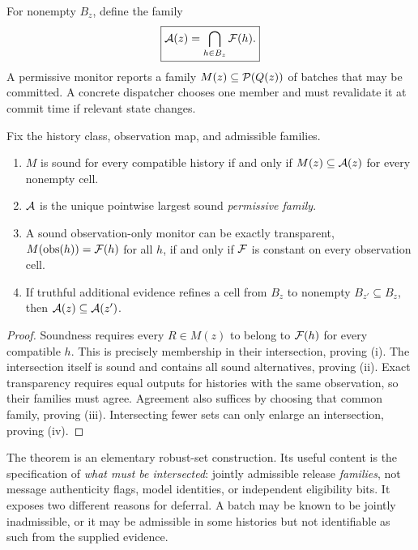 \begin{definition}
For nonempty $B_z$, define the family
\begin{equation}
\boxed{\mathcal A(z)=\bigcap_{h\in B_z}\mathcal F(h).}
\label{eq:envelope}
\end{equation}
A permissive monitor reports a family $M(z)\subseteq\mathcal P(Q(z))$ of batches that may be committed. A concrete dispatcher chooses one member and must revalidate it at commit time if relevant state changes.
\end{definition}

\begin{theorem}
Fix the history class, observation map, and admissible families.
\begin{enumerate}[label=(\roman*)]
\item $M$ is sound for every compatible history if and only if $M(z)\subseteq\mathcal A(z)$ for every nonempty cell.
\item $\mathcal A$ is the unique pointwise largest sound \emph{permissive family}.
\item A sound observation-only monitor can be exactly transparent, $M(\operatorname{obs}(h))=\mathcal F(h)$ for all $h$, if and only if $\mathcal F$ is constant on every observation cell.
\item If truthful additional evidence refines a cell from $B_z$ to nonempty $B_{z'}\subseteq B_z$, then $\mathcal A(z)\subseteq\mathcal A(z')$.
\end{enumerate}
\end{theorem}
\begin{proof}
Soundness requires every $R\in M(z)$ to belong to $\mathcal F(h)$ for every compatible $h$. This is precisely membership in their intersection, proving (i). The intersection itself is sound and contains all sound alternatives, proving (ii). Exact transparency requires equal outputs for histories with the same observation, so their families must agree. Agreement also suffices by choosing that common family, proving (iii). Intersecting fewer sets can only enlarge an intersection, proving (iv).
\end{proof}

The theorem is an elementary robust-set construction. Its useful content is the specification of \emph{what must be intersected}: jointly admissible release \emph{families}, not message authenticity flags, model identities, or independent eligibility bits. It exposes two different reasons for deferral. A batch may be known to be jointly inadmissible, or it may be admissible in some histories but not identifiable as such from the supplied evidence.

